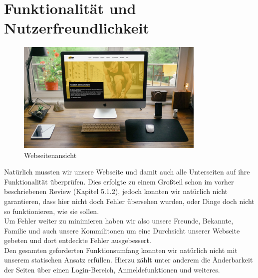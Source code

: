 \documentclass[12pt,a4paper]{article}
\begin{document}
\section{Funktionalität und Nutzerfreundlichkeit}
\begin{figure}
  \includegraphics[width=9cm]{Home_Desktop.jpg}
  \caption{Webseitenansicht}
\end{figure}
Natürlich mussten wir unsere Webseite und damit auch alle Unterseiten auf ihre Funktionalität überprüfen. Dies erfolgte zu einem Großteil schon im vorher beschriebenen Review (Kapitel 5.1.2), jedoch konnten wir natürlich nicht garantieren, dass hier nicht doch Fehler übersehen wurden, oder Dinge doch nicht so funktionieren, wie sie sollen.\\
Um Fehler weiter zu minimieren haben wir also unsere Freunde, Bekannte, Familie und auch unsere Kommilitonen um eine Durchsicht unserer Webseite gebeten und dort entdeckte Fehler ausgebessert.\\
Den gesamten geforderten Funktionsumfang konnten wir natürlich nicht mit unserem statischen Ansatz erfüllen. Hierzu zählt unter anderem die Änderbarkeit der Seiten über einen Login-Bereich, Anmeldefunktionen und weiteres.
\end{document}
